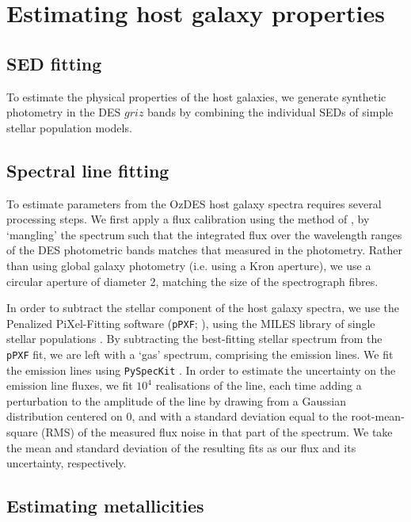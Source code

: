 \documentclass[fleqn,usenatbib,]{mnras}
\begin{document}
\section{Estimating host galaxy properties \label{sec:measure}}

\subsection{SED fitting \label{subsec:sedfit}}

To estimate the physical properties of the host galaxies, we generate synthetic photometry in the DES $griz$ bands by combining the individual SEDs of simple stellar population models. 

\subsection{Spectral line fitting \label{subsec:linefit}}

To estimate parameters from the OzDES host galaxy spectra requires several processing steps. We first apply a flux calibration using the method of \citet{Swann2020}, by `mangling' the spectrum such that the integrated flux over the wavelength ranges of the DES photometric bands matches that measured in the photometry. Rather than using global galaxy photometry (i.e. using a Kron aperture), we use a circular aperture of diameter 2\arcsec, matching the size of the spectrograph fibres.  

In order to subtract the stellar component of the host galaxy spectra, we use the Penalized PiXel-Fitting software (\texttt{pPXF}; \citealt{Cappellari2004,Cappellari2012,Cappellari2017}), using the MILES library of single stellar populations \citep{Vazdekis2010}. By subtracting the best-fitting stellar spectrum from the \texttt{pPXF} fit, we are left with a `gas' spectrum, comprising the emission lines. We fit the emission lines using \texttt{PySpecKit} \citep{Ginsburg2011}. In order to estimate the uncertainty on the emission line fluxes, we fit $10^4$ realisations of the line, each time adding a perturbation to the amplitude of the line by drawing from a Gaussian distribution centered on 0, and with a standard deviation equal to the root-mean-square (RMS) of the measured flux noise in that part of the spectrum. We take the mean and standard deviation of the resulting fits as our flux and its uncertainty, respectively.

\subsection{Estimating metallicities \label{subsec:calc_Z}}
\end{document}
